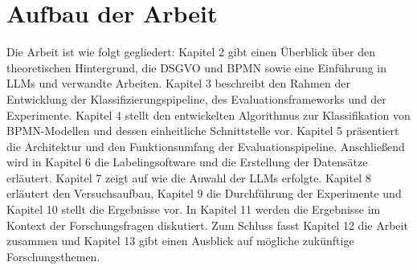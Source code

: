 \section{Aufbau der Arbeit}\label{sec:aufbau-der-arbeit}

Die Arbeit ist wie folgt gegliedert: Kapitel 2 gibt einen Überblick über den theoretischen Hintergrund, die \ac{DSGVO} und \ac{BPMN} sowie eine Einführung in \acp{LLM} und verwandte Arbeiten. Kapitel 3 beschreibt den Rahmen der Entwicklung der Klassifizierungspipeline, des Evaluationsframeworks und der Experimente. Kapitel 4 stellt den entwickelten Algorithmus zur Klassifikation von \ac{BPMN}-Modellen und dessen einheitliche Schnittstelle vor. Kapitel 5 präsentiert die Architektur und den Funktionsumfang der Evaluationspipeline. Anschließend wird in Kapitel 6 die Labelingsoftware und die Erstellung der Datensätze erläutert. Kapitel 7 zeigt auf wie die Auwahl der \acp{LLM} erfolgte. Kapitel 8 erläutert den Versuchsaufbau, Kapitel 9 die Durchführung der Experimente und Kapitel 10 stellt die Ergebnisse vor. In Kapitel 11 werden die Ergebnisse im Kontext der Forschungsfragen diskutiert. Zum Schluss fasst Kapitel 12 die Arbeit zusammen und Kapitel 13 gibt einen Ausblick auf mögliche zukünftige Forschungsthemen.